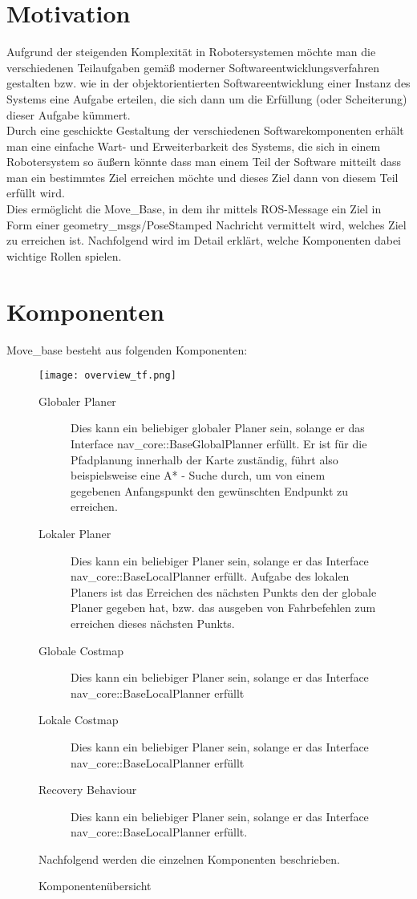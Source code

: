 \documentclass[oribibl]{llncs}
\begin{document}
\section{Motivation}
Aufgrund der steigenden Komplexität in Robotersystemen möchte man die verschiedenen Teilaufgaben gemäß moderner Softwareentwicklungsverfahren gestalten bzw. wie in der objektorientierten Softwareentwicklung einer Instanz des Systems eine Aufgabe erteilen, die sich dann um die Erfüllung (oder Scheiterung) dieser Aufgabe kümmert.\\
Durch eine geschickte Gestaltung der verschiedenen Softwarekomponenten erhält man eine einfache Wart- und Erweiterbarkeit des Systems, die sich in einem Robotersystem so äußern könnte dass man einem Teil der Software mitteilt dass man ein bestimmtes Ziel erreichen möchte und dieses Ziel dann von diesem Teil erfüllt wird.\\
Dies ermöglicht die Move\_Base, in dem ihr mittels ROS-Message ein Ziel in Form einer geometry\_msgs/PoseStamped Nachricht vermittelt wird, welches Ziel zu erreichen ist. Nachfolgend wird im Detail erklärt, welche Komponenten dabei wichtige Rollen spielen.
\section{Komponenten}
Move\_base besteht aus folgenden Komponenten: \cite{moveBase}
\begin{figure}
	\centering
  \texttt{[image: overview\_tf.png]}
	\caption{Komponentenübersicht}
	\cite{moveBaseComponenents}
\begin{description}	
\item[Globaler Planer]
Dies kann ein beliebiger globaler Planer sein, solange er das Interface nav\_core::BaseGlobalPlanner erfüllt. Er ist für die Pfadplanung innerhalb der Karte zuständig, führt also beispielsweise eine A* - Suche durch, um von einem gegebenen Anfangspunkt den gewünschten Endpunkt zu erreichen.
\item[Lokaler Planer]
Dies kann ein beliebiger Planer sein, solange er das Interface nav\_core::BaseLocalPlanner erfüllt. Aufgabe des lokalen Planers ist das Erreichen des nächsten Punkts den der globale Planer gegeben hat, bzw. das ausgeben von Fahrbefehlen zum erreichen dieses nächsten Punkts.
\item[Globale Costmap]
Dies kann ein beliebiger Planer sein, solange er das Interface nav\_core::BaseLocalPlanner erfüllt
\item[Lokale Costmap]
Dies kann ein beliebiger Planer sein, solange er das Interface nav\_core::BaseLocalPlanner erfüllt
\item[Recovery Behaviour]
Dies kann ein beliebiger Planer sein, solange er das Interface nav\_core::BaseLocalPlanner erfüllt.

\end{description}

Nachfolgend werden die einzelnen Komponenten beschrieben.
\end{figure}
\end{document}
